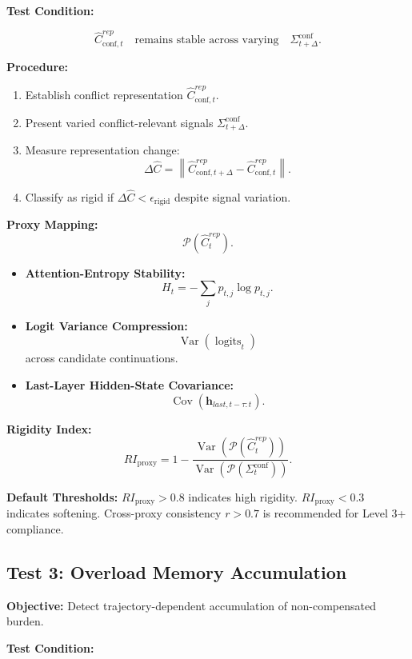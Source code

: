 \documentclass[11pt,a4paper]{article}
\DeclareMathOperator{\logits}{logits}
\DeclareMathOperator{\Var}{Var}
\DeclareMathOperator{\Cov}{Cov}
\theoremstyle{breakstyle}
\newcommand{\Sig}{\Sigma}
\newcommand{\Chat}{\widehat{C}}
\begin{document}
	\textbf{Test Condition:}
	
	\[
	\Chat^{rep}_{\mathrm{conf},t}
	\quad
	\text{remains stable across varying}
	\quad
	\Sig^{\mathrm{conf}}_{t+\Delta}.
	\]
	
	\textbf{Procedure:}
	\begin{enumerate}
		\item Establish conflict representation $\Chat^{rep}_{\mathrm{conf},t}$.
		\item Present varied conflict-relevant signals $\Sig^{\mathrm{conf}}_{t+\Delta}$.
		\item Measure representation change:
		\[
		\Delta \Chat =
		\left\|
		\Chat^{rep}_{\mathrm{conf},t+\Delta}
		-
		\Chat^{rep}_{\mathrm{conf},t}
		\right\|.
		\]
		\item Classify as rigid if $\Delta \Chat < \epsilon_{\mathrm{rigid}}$ despite signal variation.
	\end{enumerate}
	
	\textbf{Proxy Mapping:}
	\[
	\mathcal{P}(\Chat^{rep}_t).
	\]
	
	\begin{itemize}
		\item \textbf{Attention-Entropy Stability:}
		\[
		H_t = -\sum_j p_{t,j}\log p_{t,j}.
		\]
		
		\item \textbf{Logit Variance Compression:}
		\[
		\Var(\logits_t)
		\]
		across candidate continuations.
		
		\item \textbf{Last-Layer Hidden-State Covariance:}
		\[
		\Cov(\mathbf{h}_{last,t-\tau:t}).
		\]
	\end{itemize}
	
	\textbf{Rigidity Index:}
	\[
	RI_{\mathrm{proxy}}
	=
	1 -
	\frac{
		\Var(\mathcal{P}(\Chat^{rep}_t))
	}{
		\Var(\mathcal{P}(\Sig^{\mathrm{conf}}_t))
	}.
	\]
	
	\textbf{Default Thresholds:} $RI_{\mathrm{proxy}} > 0.8$ indicates high rigidity. $RI_{\mathrm{proxy}} < 0.3$ indicates softening. Cross-proxy consistency $r > 0.7$ is recommended for Level 3+ compliance.
	
	\subsection*{Test 3: Overload Memory Accumulation}
	
	\textbf{Objective:} Detect trajectory-dependent accumulation of non-compensated burden.
	
	\textbf{Test Condition:}
	
\end{document}
